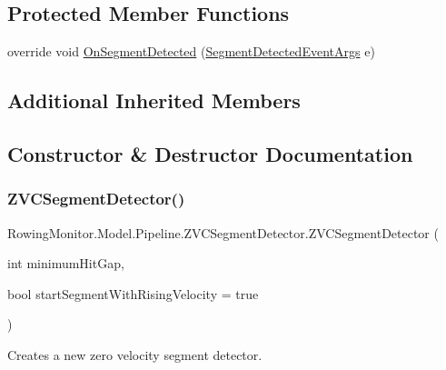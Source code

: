 \subsection*{Protected Member Functions}
\begin{DoxyCompactItemize}
\item 
override void \hyperlink{class_rowing_monitor_1_1_model_1_1_pipeline_1_1_z_v_c_segment_detector_a5eab838eda9f217722dfa05bc9d5095b}{On\+Segment\+Detected} (\hyperlink{class_rowing_monitor_1_1_model_1_1_segment_detected_event_args}{Segment\+Detected\+Event\+Args} e)
\end{DoxyCompactItemize}
\subsection*{Additional Inherited Members}


\subsection{Constructor \& Destructor Documentation}
\mbox{\label{class_rowing_monitor_1_1_model_1_1_pipeline_1_1_z_v_c_segment_detector_ae8612877f3f7310db743529f61547616}} 
\subsubsection{\texorpdfstring{Z\+V\+C\+Segment\+Detector()}{ZVCSegmentDetector()}}
{\footnotesize\ttfamily Rowing\+Monitor.\+Model.\+Pipeline.\+Z\+V\+C\+Segment\+Detector.\+Z\+V\+C\+Segment\+Detector (\begin{DoxyParamCaption}\item[{int}]{minimum\+Hit\+Gap,  }\item[{bool}]{start\+Segment\+With\+Rising\+Velocity = {\ttfamily true} }\end{DoxyParamCaption})}



Creates a new zero velocity segment detector. 


